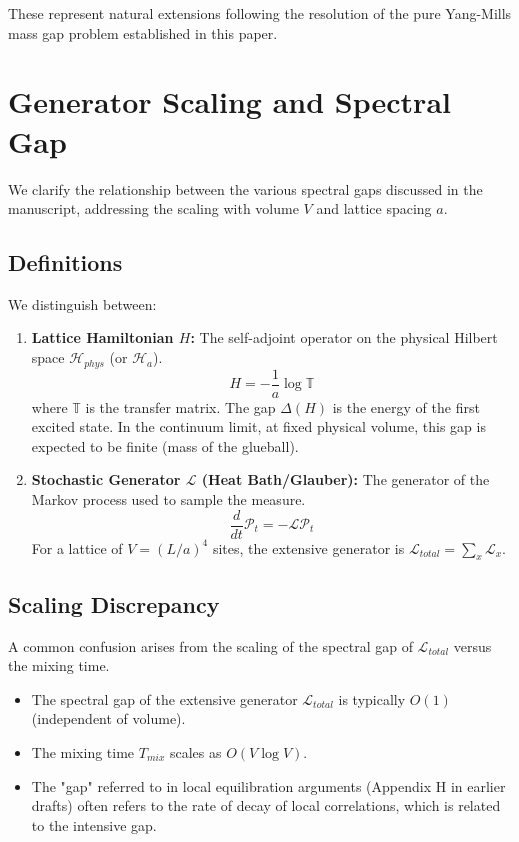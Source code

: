 These represent natural extensions following the resolution of 
the pure Yang-Mills mass gap problem established in this paper.

\section{Generator Scaling and Spectral Gap}
\label{sec:generator_scaling}

We clarify the relationship between the various spectral gaps discussed in the manuscript, addressing the scaling with volume $V$ and lattice spacing $a$.

\subsection{Definitions}
We distinguish between:
\begin{enumerate}
    \item \textbf{Lattice Hamiltonian $H$:} The self-adjoint operator on the physical Hilbert space $\mathcal{H}_{phys}$ (or $\mathcal{H}_a$).
    \[ H = -\frac{1}{a} \log \mathbb{T} \]
    where $\mathbb{T}$ is the transfer matrix. The gap $\Delta(H)$ is the energy of the first excited state. In the continuum limit, at fixed physical volume, this gap is expected to be finite (mass of the glueball).
    \item \textbf{Stochastic Generator $\mathcal{L}$ (Heat Bath/Glauber):} The generator of the Markov process used to sample the measure.
    \[ \frac{d}{dt} \mathcal{P}_t = -\mathcal{L} \mathcal{P}_t \]
    For a lattice of $V = (L/a)^4$ sites, the extensive generator is $\mathcal{L}_{total} = \sum_x \mathcal{L}_x$.
\end{enumerate}

\subsection{Scaling Discrepancy}
A common confusion arises from the scaling of the spectral gap of $\mathcal{L}_{total}$ versus the mixing time.
\begin{itemize}
    \item The spectral gap of the extensive generator $\mathcal{L}_{total}$ is typically $O(1)$ (independent of volume).
    \item The mixing time $T_{mix}$ scales as $O(V \log V)$.
    \item The "gap" referred to in local equilibration arguments (Appendix H in earlier drafts) often refers to the rate of decay of local correlations, which is related to the intensive gap.
\end{itemize}

